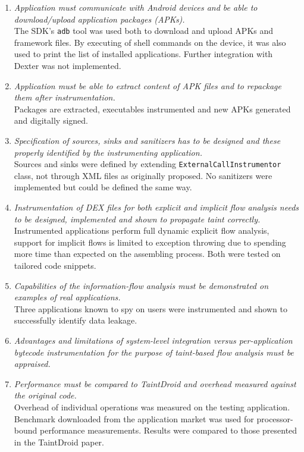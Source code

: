 \documentclass[12pt,twoside,notitlepage]{report}
\begin{document}
\begin{enumerate}
	\item \emph{Application must communicate with Android devices and be able to download/upload application packages (APKs).} \\
	The SDK's \verb$adb$ tool was used both to download and upload APKs and framework files. By executing of shell commands on the device, it was also used to print the list of installed applications. Further integration with Dexter was not implemented.

	\item \emph{Application must be able to extract content of APK files and to repackage them after instrumentation.} \\
	Packages are extracted, executables instrumented and new APKs generated and digitally signed.

	\item \emph{Specification of sources, sinks and sanitizers has to be designed and these properly identified by the instrumenting application.} \\
	Sources and sinks were defined by extending \verb$ExternalCallInstrumentor$ class, not through XML files as originally proposed. No sanitizers were implemented but could be defined the same way.

	\item \emph{Instrumentation of DEX files for both explicit and implicit flow analysis needs to be designed, implemented and shown to propagate taint correctly.} \\
	Instrumented applications perform full dynamic explicit flow analysis, support for implicit flows is limited to exception throwing due to spending more time than expected on the assembling process. Both were tested on tailored code snippets.

	\item \emph{Capabilities of the information-flow analysis must be demonstrated on examples of real applications.} \\
	Three applications known to spy on users were instrumented and shown to successfully identify data leakage. 
      
	\item \emph{Advantages and limitations of system-level integration versus per-application bytecode instrumentation for the purpose of taint-based flow analysis must be appraised.} \\

	\item \emph{Performance must be compared to TaintDroid and overhead measured against the original code.} \\
	Overhead of individual operations was measured on the testing application. Benchmark downloaded from the application market was used for processor-bound performance measurements. Results were compared to those presented in the TaintDroid paper.
\end{enumerate}
\end{document}
